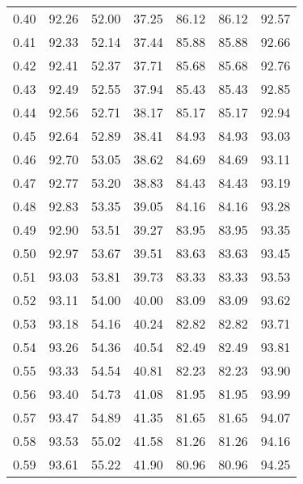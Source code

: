 \begin{tabular}{|c|c|c|c|c|c|c|}
      0.40 &     92.26 &     52.00 &      37.25 &   86.12 &      86.12 &         92.57 \\
      0.41 &     92.33 &     52.14 &      37.44 &   85.88 &      85.88 &         92.66 \\
      0.42 &     92.41 &     52.37 &      37.71 &   85.68 &      85.68 &         92.76 \\
      0.43 &     92.49 &     52.55 &      37.94 &   85.43 &      85.43 &         92.85 \\
      0.44 &     92.56 &     52.71 &      38.17 &   85.17 &      85.17 &         92.94 \\
      0.45 &     92.64 &     52.89 &      38.41 &   84.93 &      84.93 &         93.03 \\
      0.46 &     92.70 &     53.05 &      38.62 &   84.69 &      84.69 &         93.11 \\
      0.47 &     92.77 &     53.20 &      38.83 &   84.43 &      84.43 &         93.19 \\
      0.48 &     92.83 &     53.35 &      39.05 &   84.16 &      84.16 &         93.28 \\
      0.49 &     92.90 &     53.51 &      39.27 &   83.95 &      83.95 &         93.35 \\
      0.50 &     92.97 &     53.67 &      39.51 &   83.63 &      83.63 &         93.45 \\
      0.51 &     93.03 &     53.81 &      39.73 &   83.33 &      83.33 &         93.53 \\
      0.52 &     93.11 &     54.00 &      40.00 &   83.09 &      83.09 &         93.62 \\
      0.53 &     93.18 &     54.16 &      40.24 &   82.82 &      82.82 &         93.71 \\
      0.54 &     93.26 &     54.36 &      40.54 &   82.49 &      82.49 &         93.81 \\
      0.55 &     93.33 &     54.54 &      40.81 &   82.23 &      82.23 &         93.90 \\
      0.56 &     93.40 &     54.73 &      41.08 &   81.95 &      81.95 &         93.99 \\
      0.57 &     93.47 &     54.89 &      41.35 &   81.65 &      81.65 &         94.07 \\
      0.58 &     93.53 &     55.02 &      41.58 &   81.26 &      81.26 &         94.16 \\
      0.59 &     93.61 &     55.22 &      41.90 &   80.96 &      80.96 &         94.25 \\

\end{tabular}
